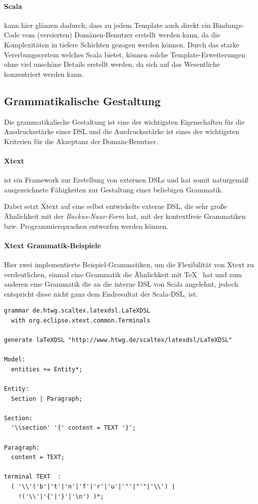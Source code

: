 \paragraph{Scala} kann hier glänzen dadurch, dass zu jedem Template auch
direkt ein Bindungs-Code vom (versierten) Domänen-Benutzer erstellt
werden kann, da die Komplexitäten in tiefere Schichten gezogen werden können.
Durch das starke Vererbungssystem welches Scala bietet, können solche
Template-Erweiterungen ohne viel unschöne Details erstellt werden, da sich
auf das Wesentliche konzentriert werden kann.


\subsection{Grammatikalische Gestaltung}\label{sec-grammatikGestaltung}

Die grammatikalische Gestaltung ist eine der wichtigsten Eigenschaften
für die Ausdrucksstärke einer DSL und die Ausdrucksstärke ist eines
der wichtigsten Kriterien für die Akzeptanz der Domain-Benutzer.

\paragraph{Xtext} ist ein Framework zur Erstellung von externen DSLs und
hat somit naturgemäß ausgezeichnete Fähigkeiten zur Gestaltung einer beliebigen
Grammatik.

Dabei setzt Xtext auf eine selbst entwickelte externe DSL, die sehr große
Ähnlichkeit mit der \emph{Backus-Naur-Form} hat, mit der kontextfreie
Grammatiken bzw. Programmiersprachen entworfen werden können.

\paragraph{Xtext Grammatik-Beispiele}

Hier zwei implementierte Beispiel-Grammatiken, um die Flexibilität von
Xtext zu verdeutlichen, einmal eine Grammatik die Ähnlichkeit mit \TeX~
hat und zum anderen eine Grammatik die an die interne DSL von Scala angelehnt,
jedoch entspricht diese nicht ganz dem Endresultat der Scala-DSL, ist.

\begin{lstlisting}[caption=\TeX-ähnliches Xtext-Grammatik-Snippet.]
grammar de.htwg.scaltex.latexdsl.LaTeXDSL
  with org.eclipse.xtext.common.Terminals

generate laTeXDSL "http://www.htwg.de/scaltex/latexdsl/LaTeXDSL"

Model:
  entities += Entity*;

Entity:
  Section | Paragraph;

Section:
  '\\section' '{' content = TEXT '}';

Paragraph:
  content = TEXT;

terminal TEXT  : 
  ( '\\'('b'|'t'|'n'|'f'|'r'|'u'|'"'|"'"|'\\') |
    !('\\'|'{'|'}'|'\n') )*;
\end{lstlisting}


